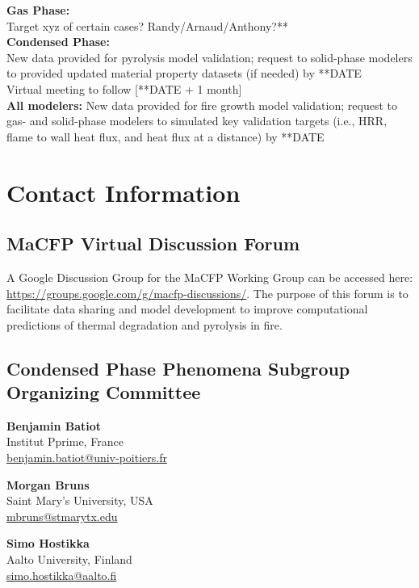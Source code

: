 \documentclass[12pt]{article}
\begin{document}
\textbf{Gas Phase:}\\
Target xyz of certain cases? Randy/Arnaud/Anthony?**\\

\textbf{Condensed Phase:}\\
New data provided for pyrolysis model validation; request to solid-phase modelers to provided updated material property datasets (if needed) by **DATE\\
Virtual meeting to follow [**DATE + 1 month]\\

\textbf{All modelers:}
New data provided for fire growth model validation; request to gas- and solid-phase modelers to simulated key validation targets (i.e., HRR, flame to wall heat flux, and heat flux at a distance) by **DATE\\


\clearpage
\section{Contact Information}
 \subsection*{MaCFP Virtual Discussion Forum}
A Google Discussion Group for the MaCFP Working Group can be accessed here: \url{https://groups.google.com/g/macfp-discussions/}. The purpose of this forum is to facilitate data sharing and model development to improve computational predictions of thermal degradation and pyrolysis in fire.

\subsection*{Condensed Phase Phenomena Subgroup Organizing Committee}
\setlength{\parindent}{0cm}
\textbf{Benjamin Batiot} \\
Institut Pprime, France \\
    \quad\href{mailto:benjamin.batiot@univ-poitiers.fr }{benjamin.batiot@univ-poitiers.fr }
    \vspace{0.5cm}
    
\textbf{Morgan Bruns} \\
Saint Mary's University, USA\\
\href{mailto:mbruns@stmarytx.edu}{mbruns@stmarytx.edu}
    \vspace{0.5cm}

\textbf{Simo Hostikka} \\
    Aalto University, Finland\\
    \href{mailto:simo.hostikka@aalto.fi}{simo.hostikka@aalto.fi}
   \vspace{0.5cm}
\end{document}
